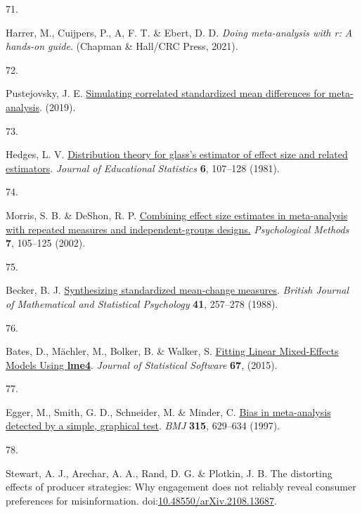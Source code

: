 \documentclass[
  man]{apa6}
\newlength{\cslhangindent}
\newlength{\csllabelwidth}
\newenvironment{CSLReferences}[2] %
 {\begin{list}{}{%
  \setlength{\itemindent}{0pt}
  \setlength{\leftmargin}{0pt}
  \setlength{\parsep}{0pt}
  \ifodd #1
   \setlength{\leftmargin}{\cslhangindent}
   \setlength{\itemindent}{-1\cslhangindent}
  \fi
  \setlength{\itemsep}{#2\baselineskip}}}
 {\end{list}}
\newcommand{\CSLLeftMargin}[1]{\parbox[t]{\csllabelwidth}{\strut#1\strut}}
\newcommand{\CSLRightInline}[1]{\parbox[t]{\linewidth - \csllabelwidth}{\strut#1\strut}}
\begin{document}
\begin{CSLReferences}{0}{0}
\CSLLeftMargin{71. }%
\CSLRightInline{Harrer, M., Cuijpers, P., A, F. T. \& Ebert, D. D. \emph{Doing meta-analysis with r: A hands-on guide}. (Chapman \& Hall/CRC Press, 2021).}

\CSLLeftMargin{72. }%
\CSLRightInline{Pustejovsky, J. E. \href{https://www.jepusto.com/simulating-correlated-smds/}{Simulating correlated standardized mean differences for meta-analysis}. (2019).}

\CSLLeftMargin{73. }%
\CSLRightInline{Hedges, L. V. \href{https://doi.org/10.3102/10769986006002107}{Distribution theory for glass's estimator of effect size and related estimators}. \emph{Journal of Educational Statistics} \textbf{6}, 107--128 (1981).}

\CSLLeftMargin{74. }%
\CSLRightInline{Morris, S. B. \& DeShon, R. P. \href{https://doi.org/10.1037/1082-989X.7.1.105}{Combining effect size estimates in meta-analysis with repeated measures and independent-groups designs.} \emph{Psychological Methods} \textbf{7}, 105--125 (2002).}

\CSLLeftMargin{75. }%
\CSLRightInline{Becker, B. J. \href{https://doi.org/10.1111/j.2044-8317.1988.tb00901.x}{Synthesizing standardized mean-change measures}. \emph{British Journal of Mathematical and Statistical Psychology} \textbf{41}, 257--278 (1988).}

\CSLLeftMargin{76. }%
\CSLRightInline{Bates, D., Mächler, M., Bolker, B. \& Walker, S. \href{https://doi.org/10.18637/jss.v067.i01}{Fitting Linear Mixed-Effects Models Using {\textbf{lme4}}}. \emph{Journal of Statistical Software} \textbf{67}, (2015).}

\CSLLeftMargin{77. }%
\CSLRightInline{Egger, M., Smith, G. D., Schneider, M. \& Minder, C. \href{https://doi.org/10.1136/bmj.315.7109.629}{Bias in meta-analysis detected by a simple, graphical test}. \emph{BMJ} \textbf{315}, 629--634 (1997).}

\CSLLeftMargin{78. }%
\CSLRightInline{Stewart, A. J., Arechar, A. A., Rand, D. G. \& Plotkin, J. B. The distorting effects of producer strategies: Why engagement does not reliably reveal consumer preferences for misinformation. doi:\href{https://doi.org/10.48550/arXiv.2108.13687}{10.48550/arXiv.2108.13687}.}


\end{CSLReferences}
\end{document}
